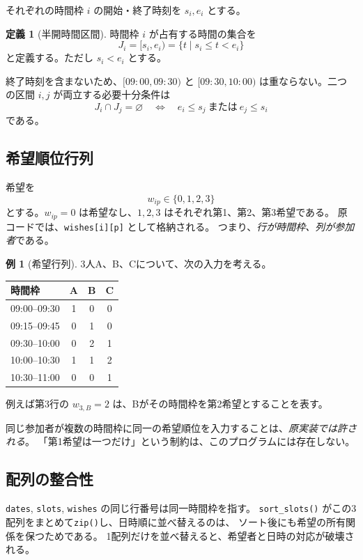 \documentclass[11pt,a4paper]{ltjsarticle}
\theoremstyle{definition}
\newtheorem{definition}[theorem]{定義}
\newtheorem{example}[theorem]{例}
\theoremstyle{remark}
\newcommand{\code}[1]{\texttt{#1}}
\begin{document}
それぞれの時間枠 $i$ の開始・終了時刻を $s_i,e_i$ とする。

\begin{definition}[半開時間区間]
時間枠 $i$ が占有する時間の集合を
\[
  J_i=[s_i,e_i)=\{t\mid s_i\leq t<e_i\}
\]
と定義する。ただし $s_i<e_i$ とする。
\end{definition}

終了時刻を含まないため、$[09{:}00,09{:}30)$ と
$[09{:}30,10{:}00)$ は重ならない。二つの区間 $i,j$ が両立する必要十分条件は
\[
 J_i\cap J_j=\varnothing
 \quad\Longleftrightarrow\quad
 e_i\leq s_j\ \text{または}\ e_j\leq s_i
\]
である。

\subsection{希望順位行列}
希望を
\[
  w_{ip}\in\{0,1,2,3\}
\]
とする。$w_{ip}=0$ は希望なし、$1,2,3$ はそれぞれ第1、第2、第3希望である。
原コードでは、\code{wishes[i][p]} として格納される。
つまり、\emph{行が時間枠、列が参加者}である。

\begin{example}[希望行列]
3人A、B、Cについて、次の入力を考える。
\begin{center}
\begin{tabular}{lccc}
\toprule
時間枠 & A & B & C \\
\midrule
09:00--09:30 & 1 & 0 & 0 \\
09:15--09:45 & 0 & 1 & 0 \\
09:30--10:00 & 0 & 2 & 1 \\
10:00--10:30 & 1 & 1 & 2 \\
10:30--11:00 & 0 & 0 & 1 \\
\bottomrule
\end{tabular}
\end{center}
例えば第3行の $w_{3,B}=2$ は、Bがその時間枠を第2希望とすることを表す。
\end{example}

同じ参加者が複数の時間枠に同一の希望順位を入力することは、\emph{原実装では許される}。
「第1希望は一つだけ」という制約は、このプログラムには存在しない。

\subsection{配列の整合性}
\code{dates}, \code{slots}, \code{wishes} の同じ行番号は同一時間枠を指す。
\code{sort\_slots()} がこの3配列をまとめて\code{zip()}し、日時順に並べ替えるのは、
ソート後にも希望の所有関係を保つためである。
1配列だけを並べ替えると、希望者と日時の対応が破壊される。
\end{document}
